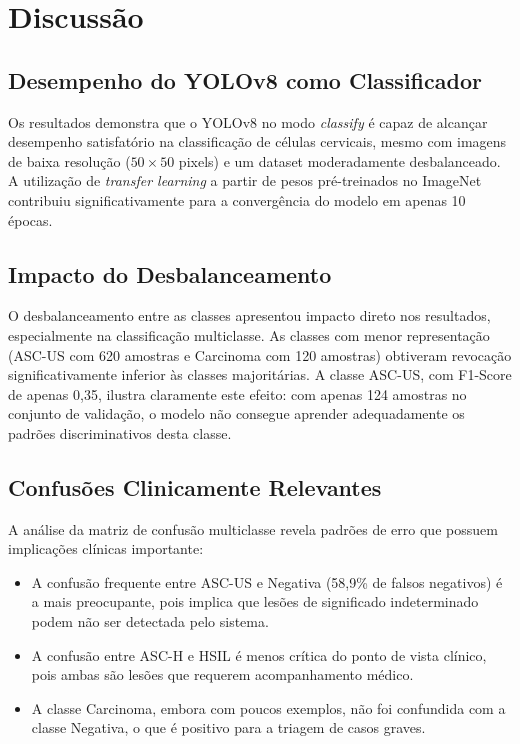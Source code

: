 \documentclass[12pt, a4paper]{article}
\begin{document}
\section{Discussão}

\subsection{Desempenho do YOLOv8 como Classificador}

Os resultados demonstra que o YOLOv8 no modo \textit{classify} é capaz de alcançar desempenho satisfatório na classificação de células cervicais, mesmo com imagens de baixa resolução ($50 \times 50$ pixels) e um dataset moderadamente desbalanceado. A utilização de \textit{transfer learning} a partir de pesos pré-treinados no ImageNet contribuiu significativamente para a convergência do modelo em apenas 10 épocas.

\subsection{Impacto do Desbalanceamento}

O desbalanceamento entre as classes apresentou impacto direto nos resultados, especialmente na classificação multiclasse. As classes com menor representação (ASC-US com 620 amostras e Carcinoma com 120 amostras) obtiveram revocação significativamente inferior às classes majoritárias. A classe ASC-US, com F1-Score de apenas 0,35, ilustra claramente este efeito: com apenas 124 amostras no conjunto de validação, o modelo não consegue aprender adequadamente os padrões discriminativos desta classe.

\subsection{Confusões Clinicamente Relevantes}

A análise da matriz de confusão multiclasse revela padrões de erro que possuem implicações clínicas importante:

\begin{itemize}
    \item A confusão frequente entre ASC-US e Negativa (58,9\% de falsos negativos) é a mais preocupante, pois implica que lesões de significado indeterminado podem não ser detectada pelo sistema.
    \item A confusão entre ASC-H e HSIL é menos crítica do ponto de vista clínico, pois ambas são lesões que requerem acompanhamento médico.
    \item A classe Carcinoma, embora com poucos exemplos, não foi confundida com a classe Negativa, o que é positivo para a triagem de casos graves.
\end{itemize}
\end{document}
